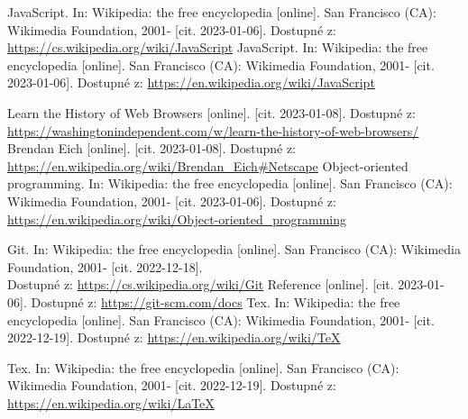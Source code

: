 \documentclass[main.tex]{subfiles}
\begin{document}
\begin{thebibliography}{99}
 JavaScript. In: Wikipedia: the free encyclopedia [online]. San Francisco (CA): Wikimedia Foundation, 2001- [cit. 2023-01-06]. Dostupné z: \url{https://cs.wikipedia.org/wiki/JavaScript}
 JavaScript. In: Wikipedia: the free encyclopedia [online]. San Francisco (CA): Wikimedia Foundation, 2001- [cit. 2023-01-06]. Dostupné z: \url{https://en.wikipedia.org/wiki/JavaScript}

 Learn the History of Web Browsers [online]. [cit. 2023-01-08]. Dostupné z: \url{https://washingtonindependent.com/w/learn-the-history-of-web-browsers/}
 Brendan Eich [online]. [cit. 2023-01-08]. Dostupné z: \url{https://en.wikipedia.org/wiki/Brendan_Eich#Netscape}
Object-oriented programming. In: Wikipedia: the free encyclopedia [online]. San Francisco (CA): Wikimedia Foundation, 2001- [cit. 2023-01-06]. Dostupné z: \url{https://en.wikipedia.org/wiki/Object-oriented\_programming}

 Git. In: Wikipedia: the free encyclopedia [online]. San Francisco (CA): Wikimedia Foundation, 2001- [cit. 2022-12-18].\\ Dostupné z: \url{https://cs.wikipedia.org/wiki/Git}
 Reference [online]. [cit. 2023-01-06]. Dostupné z: \url{https://git-scm.com/docs}
 Tex. In: Wikipedia: the free encyclopedia [online]. San Francisco (CA): Wikimedia Foundation, 2001- [cit. 2022-12-19]. Dostupné z: \url{https://en.wikipedia.org/wiki/TeX}

 Tex. In: Wikipedia: the free encyclopedia [online]. San Francisco (CA): Wikimedia Foundation, 2001- [cit. 2022-12-19]. Dostupné z: \url{https://en.wikipedia.org/wiki/LaTeX}

\end{thebibliography}
\end{document}
